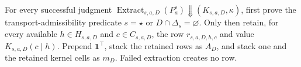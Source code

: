 For every successful judgment \(\operatorname{Extract}_{s,a,D}(P_a^s)\Downarrow(K_{s,a,D},\kappa)\), first prove the transport-admissibility predicate \(s=\star\) or \(D\cap\Delta_s=\varnothing\). Only then retain, for every available \(h\in H_{s,a,D}\) and \(c\in C_{s,a,D}\), the row \(r_{s,a,D,h,c}\) and value \(K_{s,a,D}(c\mid h)\). Prepend \(\mathbf 1^\top\), stack the retained rows as \(A_D\), and stack one and the retained kernel cells as \(m_D\). Failed extraction creates no row.
